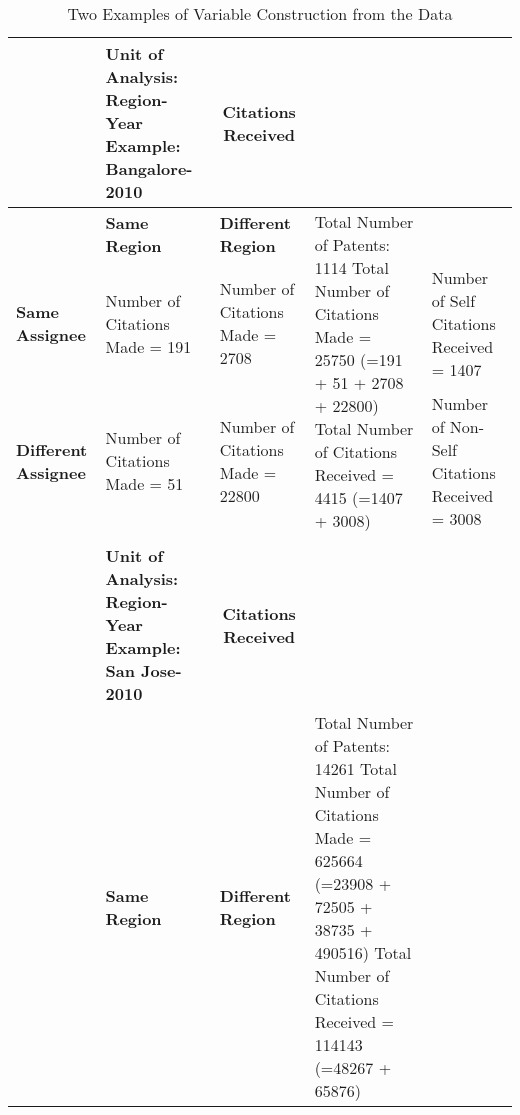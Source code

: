 \begin{sidewaystable}[htbp]\centering
 \caption{Two Examples of Variable Construction from the Data}
 \footnotesize
    \begin{tabular}{|p{8.085em}|p{8.335em}|p{8.665em}|l|l|}
    \toprule
    \rowcolor[rgb]{ .867,  .922,  .969} \multicolumn{3}{|p{25.085em}|}{\textbf{Citations Made}} & \multicolumn{1}{p{18.75em}|}{\cellcolor[rgb]{ 1,  1,  1}\textbf{Unit of Analysis: Region-Year
Example: Bangalore-2010}} & \multicolumn{1}{c|}{\cellcolor[rgb]{ 1,  .949,  .8}\textbf{Citations Received}} \\
    \midrule
    \rowcolor[rgb]{ .988,  .894,  .839} \multicolumn{1}{|c|}{} & \textbf{Same Region} & \textbf{Different Region} & \multicolumn{1}{l|}{\multirow{3}[6]{*}{\cellcolor[rgb]{ 1,  1,  1}
Total Number of Patents: 1114
Total Number of Citations Made = 25750 (=191 + 51 + 2708 + 22800)
Total Number of Citations Received = 4415 (=1407 + 3008)}} & \cellcolor[rgb]{ 1,  .949,  .8} \\
\cmidrule{1-3}\cmidrule{5-5}    \rowcolor[rgb]{ .988,  .894,  .839} \textbf{Same Assignee} & \cellcolor[rgb]{ .867,  .922,  .969}Number of Citations Made = 191 & \cellcolor[rgb]{ .867,  .922,  .969}Number of Citations Made = 2708  &       & \cellcolor[rgb]{ 1,  .949,  .8}Number of Self Citations Received = 1407 \\
\cmidrule{1-3}\cmidrule{5-5}    \rowcolor[rgb]{ .988,  .894,  .839} \textbf{Different Assignee} & \cellcolor[rgb]{ .867,  .922,  .969}Number of Citations Made = 51 & \cellcolor[rgb]{ .867,  .922,  .969}Number of Citations Made = 22800 &       & \cellcolor[rgb]{ 1,  .949,  .8}Number of Non-Self Citations Received = 3008 \\
    \midrule
    \multicolumn{1}{r}{} & \multicolumn{1}{r}{} & \multicolumn{1}{r}{} & \multicolumn{1}{r}{} & \multicolumn{1}{r}{} \\
    \midrule
    \rowcolor[rgb]{ .867,  .922,  .969} \multicolumn{3}{|p{25.085em}|}{\textbf{Citations Made}} & \multicolumn{1}{p{18.75em}|}{\cellcolor[rgb]{ 1,  1,  1}\textbf{Unit of Analysis: Region-Year
Example: San Jose-2010}} & \multicolumn{1}{c|}{\cellcolor[rgb]{ 1,  .949,  .8}\textbf{Citations Received}} \\
    \midrule
    \rowcolor[rgb]{ .988,  .894,  .839} \multicolumn{1}{|c|}{} & \textbf{Same Region} & \textbf{Different Region} & \multicolumn{1}{l|}{\multirow{3}[6]{*}{\cellcolor[rgb]{ 1,  1,  1}
Total Number of Patents: 14261
Total Number of Citations Made = 625664 (=23908 + 72505 + 38735 + 490516)
Total Number of Citations Received = 114143 (=48267 + 65876)}} & \cellcolor[rgb]{ 1,  .949,  .8} \\

\end{tabular}
\end{sidewaystable}

